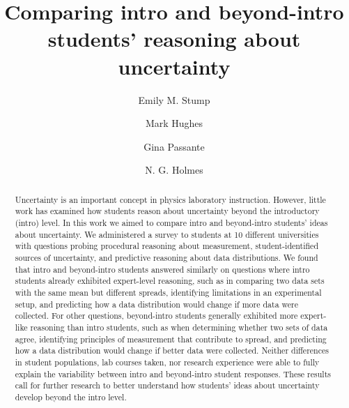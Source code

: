 \documentclass[english,aps,prstper,reprint,showpacs,longbibliography,superscriptaddress,nofootinbib]{revtex4-2}
\begin{document}
\begin{titlepage}

  
  \title{Comparing intro and beyond-intro students' reasoning about uncertainty}

  \author{Emily M. Stump}
  \author{Mark Hughes}
  \author{Gina Passante}
   \author{N. G. Holmes}


  \begin{abstract}
    Uncertainty is an important concept in physics laboratory instruction. However, little work has examined how students reason about uncertainty beyond the introductory (intro) level. In this work we aimed to compare intro and beyond-intro students' ideas about uncertainty. We administered a survey to students at 10 different universities with questions probing procedural reasoning about measurement, student-identified sources of uncertainty, and predictive reasoning about data distributions. We found that intro and beyond-intro students answered similarly on questions where intro students already exhibited expert-level reasoning, such as in comparing two data sets with the same mean but different spreads, identifying limitations in an experimental setup, and predicting how a data distribution would change if more data were collected. For other questions, beyond-intro students generally exhibited more expert-like reasoning than intro students, such as when determining whether two sets of data agree, identifying principles of measurement that contribute to spread, and predicting how a data distribution would change if better data were collected. Neither differences in student populations, lab courses taken, nor research experience were able to fully explain the variability between intro and beyond-intro student responses. These results call for further research to better understand how students' ideas about uncertainty develop beyond the intro level.
  \end{abstract}
  
  \maketitle
\end{titlepage}
\end{document}
